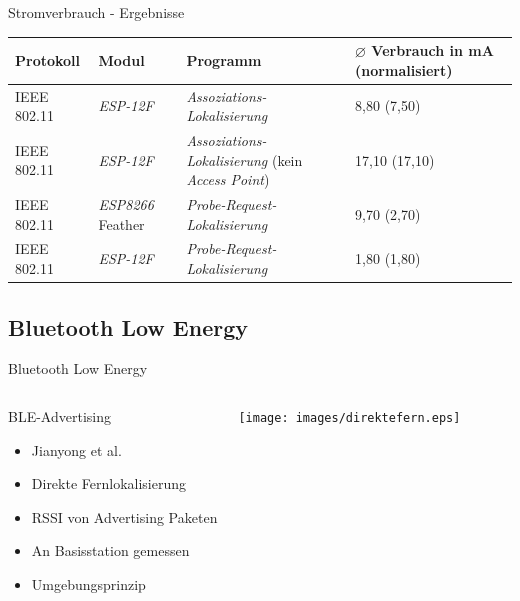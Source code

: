 \documentclass[18pt]{beamer}
\begin{document}
\begin{frame}{Stromverbrauch - Ergebnisse}
	\begin{tabular}{l|l|p{3.1cm}|R{2.1cm}}
		Protokoll & Modul & Programm  & $\varnothing$ Verbrauch in mA (normalisiert)\\
		\hline
		IEEE 802.11 & \emph{ESP-12F} & \emph{Assoziations-Lokalisierung} & 8,80 (7,50)\\
		IEEE 802.11 & \emph{ESP-12F} & \emph{Assoziations-Lokalisierung} (kein \emph{Access Point}) & 17,10 (17,10)\\
		\hline
		IEEE 802.11 & \emph{ESP8266} Feather & \emph{Probe-Request-Lokalisierung} & 9,70 (2,70)\\
		IEEE 802.11 & \emph{ESP-12F} & \emph{Probe-Request-Lokalisierung} & 1,80 (1,80)\\
		\hline
	\end{tabular}
\end{frame}


\subsection{Bluetooth Low Energy}
\begin{frame}{Bluetooth Low Energy}
	\begin{columns}
			\begin{block}{BLE-Advertising}
				\begin{itemize}
					\item Jianyong et al. \cite{jianyong2014rssi}
					\item Direkte Fernlokalisierung
					\item RSSI von Advertising Paketen
					\item An Basisstation gemessen
					\item Umgebungsprinzip
				\end{itemize}
			\end{block}
			\centering
			\texttt{[image: images/direktefern.eps]}
	\end{columns}
\end{frame}
\end{document}

